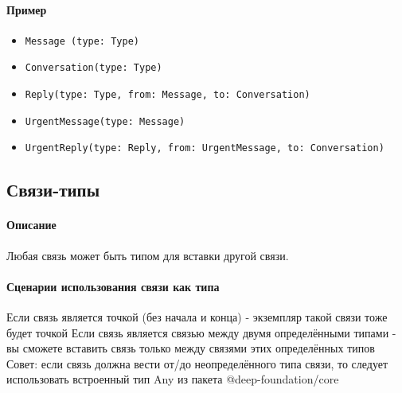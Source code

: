 \documentclass{article}
\begin{document}
\paragraph{Пример}

\begin{itemize}
  \item \texttt{Message (type: Type)}
  \item \texttt{Conversation(type: Type)}
  \item \texttt{Reply(type: Type, from: Message, to: Conversation)}
  \item \texttt{UrgentMessage(type: Message)}
  \item \texttt{UrgentReply(type: Reply, from: UrgentMessage, to:
          Conversation)}
\end{itemize}

\subsection{Связи-типы}
\paragraph{Описание}
Любая связь может быть типом для вставки другой связи.
\paragraph{Сценарии использования связи как типа}
Если связь является точкой (без начала и конца) - экземпляр такой связи тоже
будет точкой
Если связь является связью между двумя определёнными типами - вы сможете
вставить связь только между связями этих определённых типов
Совет: если связь должна вести от/до неопределённого типа связи, то следует
использовать встроенный тип Any из пакета @deep-foundation/core
\end{document}
